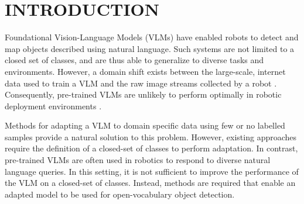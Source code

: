 \section{INTRODUCTION}

Foundational Vision-Language Models (VLMs) have enabled robots to detect \cite{clip, segment_anything, detic} and map objects \cite{clio, conceptgraphs, hovsg, bare, ovoslam} described using natural language. Such systems are not limited to a closed set of classes, and are thus able to generalize to diverse tasks and environments.
However, a domain shift exists between the large-scale, internet data used to train a VLM and the raw image streams collected by a robot \cite{seal}. Consequently, pre-trained VLMs are unlikely to perform optimally in robotic deployment environments \cite{seal, eal_semseg, self_improving, move_to_see, interactron}.  


Methods for adapting a VLM to domain specific data using few \cite{coop, clip_adapter} or no \cite{upl, ueo} labelled samples provide a natural solution to this problem. However, existing approaches require the definition of a closed-set of classes to perform adaptation. In contrast, pre-trained VLMs are often used in robotics to respond to diverse natural language queries. In this setting, it is not sufficient to improve the performance of the VLM on a closed-set of classes. Instead, methods are required that enable an adapted model to be used for open-vocabulary object detection.

